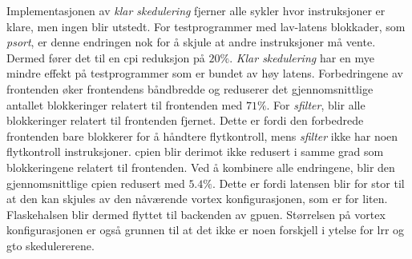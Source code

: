 Implementasjonen av \textit{klar skedulering} fjerner alle sykler hvor instruksjoner er klare, men ingen blir utstedt. For testprogrammer med lav-latens blokkader, som \textit{psort}, er denne endringen nok for å skjule at andre instruksjoner må vente. Dermed fører det til en \acrshort{cpi} reduksjon på $20\%$. \textit{Klar skedulering} har en mye mindre effekt på testprogrammer som er bundet av høy latens. Forbedringene av frontenden øker frontendens båndbredde og reduserer det gjennomsnittlige antallet blokkeringer relatert til frontenden med $71\%$. For \textit{sfilter}, blir alle blokkeringer relatert til frontenden fjernet. Dette er fordi den forbedrede frontenden bare blokkerer for å håndtere flytkontroll, mens \textit{sfilter} ikke har noen flytkontroll instruksjoner. \acrshort{cpi}en blir derimot ikke redusert i samme grad som blokkeringene relatert til frontenden. Ved å kombinere alle endringene, blir den gjennomsnittlige \acrshort{cpi}en redusert med $5.4\%$. Dette er fordi latensen blir for stor til at den kan skjules av den nåværende \Gls{vortex} konfigurasjonen, som er for liten. Flaskehalsen blir dermed flyttet til backenden av \acrshort{gpu}en. Størrelsen på \Gls{vortex} konfigurasjonen er også grunnen til at det ikke er noen forskjell i ytelse for \acrshort{lrr} og \acrshort{gto} skedulererene.